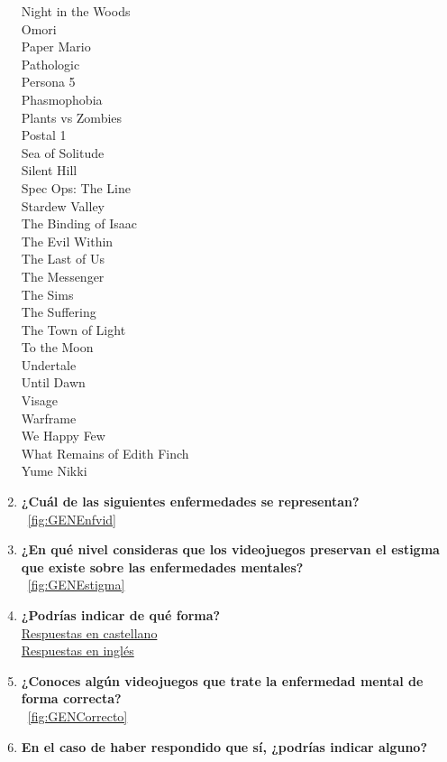 \documentclass[12pt, a4paper,twoside,titlepage]{book}
\begin{document}
\begin{enumerate}[label=\textbf{\arabic*}.]
    Night in the Woods\\
    Omori\\
    Paper Mario\\
    Pathologic\\
    Persona 5\\
    Phasmophobia\\
    Plants vs Zombies\\
    Postal 1\\
    Sea of Solitude\\
    Silent Hill\\
    Spec Ops: The Line\\
    Stardew Valley\\ 
    The Binding of Isaac \\
    The Evil Within\\
    The Last of Us\\
    The Messenger\\
    The Sims\\
    The Suffering\\
    The Town of Light\\
    To the Moon\\
    Undertale\\
    Until Dawn\\
    Visage\\
    Warframe \\
    We Happy Few\\
    What Remains of Edith Finch\\
    Yume Nikki\\

     \item \textbf{¿Cuál de las siguientes enfermedades se representan? }\\
    ~\ref{fig:GENEnfvid}
     \item \textbf{¿En qué nivel consideras que los videojuegos preservan el estigma que existe sobre las enfermedades mentales?}\\
    ~\ref{fig:GENEstigma}
     \item \textbf{¿Podrías indicar de qué forma?}\\
      \hyperref[estigmaCastellano]{Respuestas en castellano}\\
     \hyperref[estigmaIngles]{Respuestas en inglés}
     \item \textbf{¿Conoces algún videojuegos que trate la enfermedad mental de forma correcta? }\\
    ~\ref{fig:GENCorrecto}
     \item \textbf{En el caso de haber respondido que sí, ¿podrías indicar alguno?}
     \label{listadoVidCorr}
     

\end{enumerate}
\end{document}
